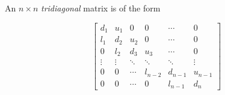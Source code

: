 \documentclass[12pt]{article}
\begin{document}
An $n \times n$ \emph{tridiagonal} matrix is of the form

$$ \begin{bmatrix}
d_1 & u_1 & 0 & 0 & \cdots & 0 \\ 
l_1 & d_2 & u_2 & 0 & \cdots & 0 \\
 0  & l_2 & d_3 & u_3 & \cdots & 0 \\
\vdots & \vdots & \ddots & \ddots & \ddots & \vdots \\ 
 0  & 0 & \cdots &  l_{n-2} & d_{n-1} & u_{n-1} \\ 
 0  & 0 & \cdots & 0 & l_{n-1} & d_{n}
\end{bmatrix} $$
\end{document}
